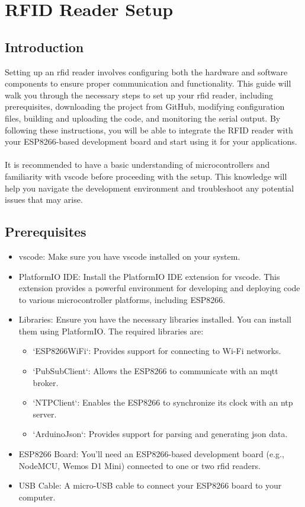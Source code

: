 \chapter{RFID Reader Setup}

\section{Introduction}
Setting up an \gls{rfid} reader involves configuring both the hardware and software components to ensure proper communication and functionality. This guide will walk you through the necessary steps to 
set up your \gls{rfid} reader, including prerequisites, downloading the project from GitHub, modifying configuration files, building and uploading the code, and monitoring the serial output. 
By following these instructions, you will be able to integrate the RFID reader with your ESP8266-based development board and start using it for your applications.\\
\\
It is recommended to have a basic understanding of microcontrollers and familiarity with \gls{vscode} before proceeding with the setup. This knowledge will help you navigate the 
development environment and troubleshoot any potential issues that may arise.

\section{Prerequisites}
\begin{itemize}
    \item \gls{vscode}: Make sure you have \gls{vscode} installed on your system.
    \item PlatformIO IDE: Install the PlatformIO IDE extension for \gls{vscode}. This extension provides a powerful environment for developing and deploying code to various 
    microcontroller platforms, including ESP8266.
    \item Libraries: Ensure you have the necessary libraries installed. You can install them using PlatformIO. The required libraries are:
        \begin{itemize}
            \item `ESP8266WiFi`: Provides support for connecting to Wi-Fi networks.
            \item `PubSubClient`: Allows the ESP8266 to communicate with an \gls{mqtt} broker.
            \item `NTPClient`: Enables the ESP8266 to synchronize its clock with an \gls{ntp} server.
            \item `ArduinoJson`: Provides support for parsing and generating \gls{json} data.
        \end{itemize}
    \item ESP8266 Board: You'll need an ESP8266-based development board (e.g., NodeMCU, Wemos D1 Mini) connected to one or two \gls{rfid} readers.
    \item USB Cable: A micro-USB cable to connect your ESP8266 board to your computer.
\end{itemize}


